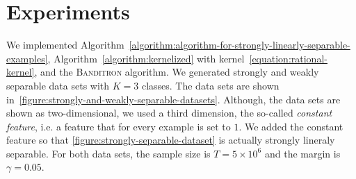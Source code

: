 \section{Experiments}
\label{section:experiments}

We implemented
Algorithm~\ref{algorithm:algorithm-for-strongly-linearly-separable-examples},
Algorithm~\ref{algorithm:kernelized} with
kernel~\eqref{equation:rational-kernel}, and the \textsc{Banditron} algorithm.
We generated strongly and weakly separable data sets with $K=3$ classes. The
data sets are shown in~\autoref{figure:strongly-and-weakly-separable-datasets}.
Although, the data sets are shown as two-dimensional, we used a third dimension,
the so-called \emph{constant feature}, i.e. a feature that for every example is
set to $1$. We added the constant feature so that
\autoref{figure:strongly-separable-dataset} is actually strongly lineraly
separable. For both data sets, the sample size is $T=5\times 10^6$ and the
margin is $\gamma=0.05$.

